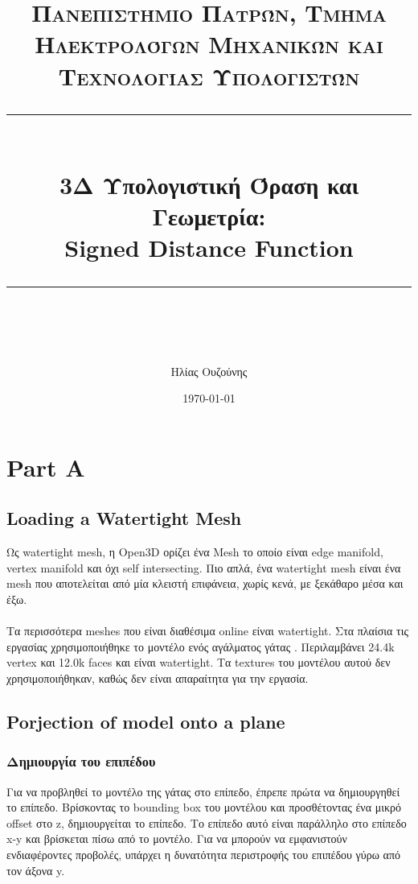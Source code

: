 \documentclass{report}
\title{	
	\normalfont\normalsize
	\textsc{Πανεπιστήμιο Πατρών, Τμήμα Ηλεκτρολόγων Μηχανικών και Τεχνολογίας Υπολογιστών}\\ %
	\vspace{25pt} %
	\rule{\linewidth}{0.5pt}\\ %
	\vspace{20pt} %
	{\huge 3Δ Υπολογιστική Όραση και Γεωμετρία: \\ Signed Distance Function}\\ %
	\vspace{12pt} %
	\rule{\linewidth}{2pt}\\ %
	\vspace{12pt} %
}
\author{\LARGE Ηλίας Ουζούνης \\ \en{up1083749}} %
\date{\normalsize\today} %
\begin{document}
\maketitle
\newpage

\sloppy
\tableofcontents
\newpage

\chapter{Part A}
\section{Loading a Watertight Mesh}

Ως watertight mesh, η Open3D ορίζει ένα Mesh το οποίο είναι edge manifold, vertex manifold και όχι self intersecting. Πιο απλά,
ένα watertight mesh είναι ένα mesh που αποτελείται από μία κλειστή επιφάνεια, χωρίς κενά, με ξεκάθαρο μέσα και έξω. 
\\\\
Τα περισσότερα meshes που είναι διαθέσιμα online είναι watertight. Στα πλαίσια τις εργασίας χρησιμοποιήθηκε το μοντέλο ενός αγάλματος γάτας
\cite{concrete-cat-statue}. Περιλαμβάνει 24.4k vertex και 12.0k faces και είναι watertight.
Τα textures του μοντέλου αυτού δεν χρησιμοποιήθηκαν, καθώς δεν είναι απαραίτητα για την εργασία.


\section{Porjection of model onto a plane}
\subsection{Δημιουργία του επιπέδου}

Για να προβληθεί το μοντέλο της γάτας στο επίπεδο, έπρεπε πρώτα να δημιουργηθεί το επίπεδο. Βρίσκοντας το bounding box του μοντέλου
και προσθέτοντας ένα μικρό offset στο z, δημιουργείται το επίπεδο. Το επίπεδο αυτό είναι παράλληλο στο επίπεδο x-y και βρίσκεται πίσω
από το μοντέλο. Για να μπορούν να εμφανιστούν ενδιαφέροντες προβολές, υπάρχει η δυνατότητα περιστροφής του επιπέδου γύρω από τον άξονα y.

\end{document}
